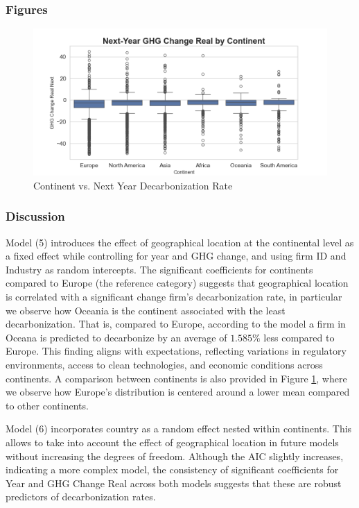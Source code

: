 

\subsubsection{Figures}

\begin{figure}[H]
\centering
  \includegraphics[width=\textwidth]{figures/ghg_change_real_next_by_continent.png}
\caption{Continent vs. Next Year Decarbonization Rate}
\label{fig:continent_vs_ghg_change_real_next}
\end{figure}

\subsubsection{Discussion}

Model (5) introduces the effect of geographical location at the continental level as a fixed effect while controlling for year and GHG change, and using firm ID and Industry as random intercepts. The significant coefficients for continents compared to Europe (the reference category) suggests that geographical location is correlated with a significant change firm's decarbonization rate, in particular we observe how Oceania is the continent associated with the least decarbonization. That is, compared to Europe, according to the model a firm in Oceana is predicted to decarbonize by an average of $1.585 \%$ less compared to Europe. This finding aligns with expectations, reflecting variations in regulatory environments, access to clean technologies, and economic conditions across continents. A comparison between continents is also provided in Figure \ref{fig:continent_vs_ghg_change_real_next}, where we observe how Europe's distribution is centered around a lower mean compared to other continents. 


Model (6) incorporates country as a random effect nested within continents. This allows to take into account the effect of geographical location in future models without increasing the degrees of freedom. Although the AIC slightly increases, indicating a more complex model, the consistency of significant coefficients for Year and GHG Change Real across both models suggests that these are robust predictors of decarbonization rates.


